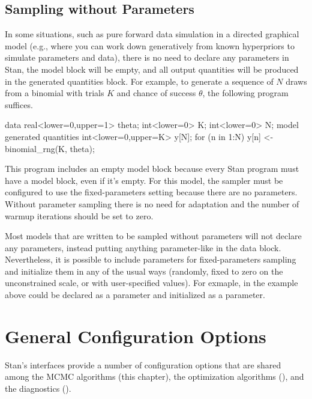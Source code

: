 \subsection{Sampling without Parameters}

In some situations, such as pure forward data simulation in a directed
graphical model (e.g., where you can work down generatively from known
hyperpriors to simulate parameters and data), there is no need to
declare any parameters in Stan, the model block will be empty, and all
output quantities will be produced in the generated quantities block.
For example, to generate a sequence of $N$ draws from a binomial with
trials $K$ and chance of success $\theta$, the following program suffices.
%
\begin{stancode}
data {
  real<lower=0,upper=1> theta;
  int<lower=0> K;
  int<lower=0> N;
}
model { 
}
generated quantities {
  int<lower=0,upper=K> y[N];
  for (n in 1:N)
    y[n] <- binomial_rng(K, theta);
}
\end{stancode}
%
This program includes an empty model block because every Stan program
must have a model block, even if it's empty.  For this model, the
sampler must be configured to use the fixed-parameters setting because
there are no parameters.  Without parameter sampling there is no need
for adaptation and the number of warmup iterations should be set to
zero.

Most models that are written to be sampled without parameters will not
declare any parameters, instead putting anything parameter-like in the
data block.  Nevertheless, it is possible to include parameters for
fixed-parameters sampling and initialize them in any of the usual ways
(randomly, fixed to zero on the unconstrained scale, or with
user-specified values).  For exmaple,  in the example
above could be declared as a parameter and initialized as a parameter.








\section{General Configuration Options}\label{general-config.section}

Stan's interfaces provide a number of configuration options that are
shared among the MCMC algorithms (this chapter), the optimization
algorithms (), and the diagnostics
(). 

